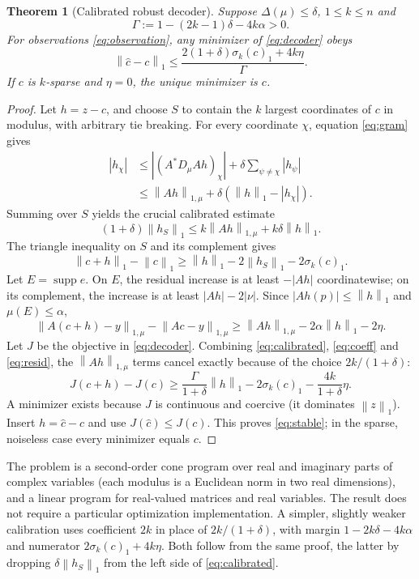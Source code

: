 \documentclass[11pt]{article}
\newtheorem{theorem}{Theorem}[section]
\theoremstyle{remark}\newtheorem{remark}[theorem]{Remark}
\newcommand{\norm}[1]{\left\|#1\right\|}
\newcommand{\supp}{\operatorname{supp}}
\begin{document}
\begin{theorem}[Calibrated robust decoder]\label{thm:convex}
Suppose $\Delta(\mu)\le\delta$, $1\le k\le n$ and
\[
 \Gamma:=1-(2k-1)\delta-4k\alpha>0.
\]
For observations \eqref{eq:observation}, any minimizer of \eqref{eq:decoder} obeys
\begin{equation}\label{eq:stable}
 \norm{\widehat c-c}_1\le
 \frac{2(1+\delta)\sigma_k(c)_1+4k\eta}{\Gamma}.
\end{equation}
If $c$ is $k$-sparse and $\eta=0$, the unique minimizer is $c$.
\end{theorem}
\begin{proof}
Let $h=z-c$, and choose $S$ to contain the $k$ largest coordinates of $c$ in modulus, with arbitrary tie breaking. For every coordinate $\chi$, equation \eqref{eq:gram} gives
\begin{align*}
 |h_\chi|&\le |(A^*D_\mu Ah)_\chi|+\delta\sum_{\psi\ne\chi}|h_\psi|\\
 &\le\norm{Ah}_{1,\mu}+\delta(\norm h_1-|h_\chi|).
\end{align*}
Summing over $S$ yields the crucial calibrated estimate
\begin{equation}\label{eq:calibrated}
 (1+\delta)\norm{h_S}_1\le k\norm{Ah}_{1,\mu}+k\delta\norm h_1.
\end{equation}
The triangle inequality on $S$ and its complement gives
\begin{equation}\label{eq:coeff}
 \norm{c+h}_1-\norm c_1\ge\norm h_1-2\norm{h_S}_1-2\sigma_k(c)_1.
\end{equation}
Let $E=\supp e$. On $E$, the residual increase is at least $-|Ah|$ coordinatewise; on its complement, the increase is at least $|Ah|-2|\nu|$. Since $|Ah(p)|\le\norm h_1$ and $\mu(E)\le\alpha$,
\begin{equation}\label{eq:resid}
 \norm{A(c+h)-y}_{1,\mu}-\norm{Ac-y}_{1,\mu}
 \ge\norm{Ah}_{1,\mu}-2\alpha\norm h_1-2\eta.
\end{equation}
Let $J$ be the objective in \eqref{eq:decoder}. Combining \eqref{eq:calibrated}, \eqref{eq:coeff} and \eqref{eq:resid}, the $\norm{Ah}_{1,\mu}$ terms cancel exactly because of the choice $2k/(1+\delta)$:
\[
 J(c+h)-J(c)\ge \frac{\Gamma}{1+\delta}\norm h_1
 -2\sigma_k(c)_1-\frac{4k}{1+\delta}\eta.
\]
A minimizer exists because $J$ is continuous and coercive (it dominates $\norm z_1$). Insert $h=\widehat c-c$ and use $J(\widehat c)\le J(c)$. This proves \eqref{eq:stable}; in the sparse, noiseless case every minimizer equals $c$.
\end{proof}
The problem is a second-order cone program over real and imaginary parts of complex variables (each modulus is a Euclidean norm in two real dimensions), and a linear program for real-valued matrices and real variables. The result does not require a particular optimization implementation. A simpler, slightly weaker calibration uses coefficient $2k$ in place of $2k/(1+\delta)$, with margin $1-2k\delta-4k\alpha$ and numerator $2\sigma_k(c)_1+4k\eta$. Both follow from the same proof, the latter by dropping $\delta\norm{h_S}_1$ from the left side of \eqref{eq:calibrated}.
\end{document}
